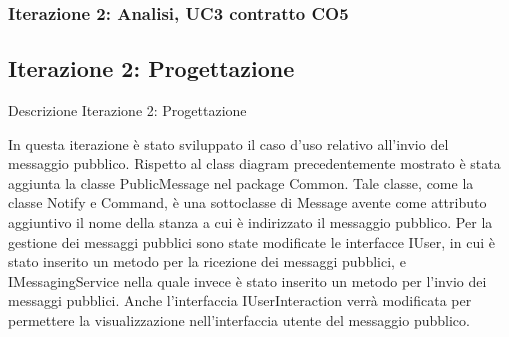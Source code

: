 \begin{frame}
 \frametitle{Iterazione 2: Analisi, UC3 contratto CO5}
  \begin{table}[!htbp]
   \caption {UC3 Contratto CO5 - publicMsg}
    \label{table_CO5}
   \end{table}
\end{frame}

\subsection{Iterazione 2: Progettazione}
\begin{frame} {Descrizione Iterazione 2: Progettazione}
  \begin{scriptsize}
    In questa iterazione è stato sviluppato il caso d'uso relativo all'invio del messaggio pubblico. Rispetto al class diagram precedentemente mostrato è stata 
    aggiunta la classe PublicMessage nel package Common. Tale classe, come la classe Notify e Command, è una sottoclasse di Message avente come attributo aggiuntivo 
    il nome della stanza a cui è indirizzato il messaggio pubblico.
    Per la gestione dei messaggi pubblici sono state modificate le interfacce IUser, in cui è stato inserito un metodo per la ricezione dei messaggi pubblici, e 
    IMessagingService nella quale invece è stato inserito un metodo per l'invio dei messaggi pubblici. Anche l'interfaccia IUserInteraction verrà modificata per 
    permettere la visualizzazione nell'interfaccia utente del messaggio pubblico.
  \end{scriptsize}
\end{frame}


